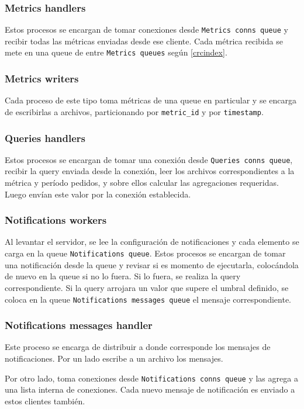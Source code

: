 \documentclass[titlepage,a4paper,oneside]{article}
\begin{document}
\subsubsection{Metrics handlers}
Estos procesos se encargan de tomar conexiones desde \texttt{Metrics conns queue} y recibir todas las métricas enviadas desde ese cliente. Cada métrica recibida se mete en una queue de entre \texttt{Metrics queues} según \eqref{crcindex}.

\subsubsection{Metrics writers}
Cada proceso de este tipo toma métricas de una queue en particular y se encarga de escribirlas a archivos, particionando por \texttt{metric\_id} y por \texttt{timestamp}.

\subsubsection{Queries handlers}
Estos procesos se encargan de tomar una conexión desde \texttt{Queries conns queue}, recibir la query enviada desde la conexión, leer los archivos correspondientes a la métrica y período pedidos, y sobre ellos calcular las agregaciones requeridas. Luego envían este valor por la conexión establecida.

\subsubsection{Notifications workers}
Al levantar el servidor, se lee la configuración de notificaciones y cada elemento se carga en la queue \texttt{Notifications queue}. Estos procesos se encargan de tomar una notificación desde la queue y revisar si es momento de ejecutarla, colocándola de nuevo en la queue si no lo fuera. Si lo fuera, se realiza la query correspondiente. Si la query arrojara un valor que supere el umbral definido, se coloca en la queue \texttt{Notifications messages queue} el mensaje correspondiente.

\subsubsection{Notifications messages handler}
Este proceso se encarga de distribuir a donde corresponde los mensajes de notificaciones. Por un lado escribe a un archivo los mensajes.

Por otro lado, toma conexiones desde \texttt{Notifications conns queue} y las agrega a una lista interna de conexiones. Cada nuevo mensaje de notificación es enviado a estos clientes también.
\end{document}
